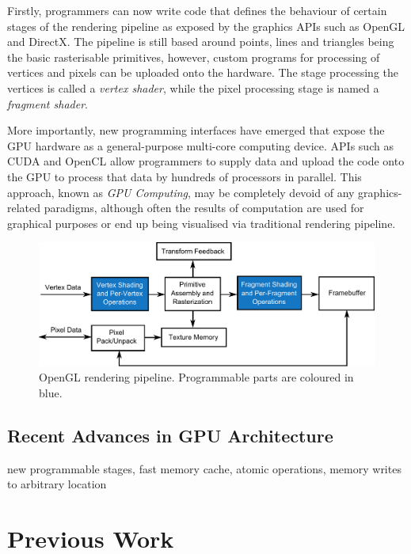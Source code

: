 \documentclass[11pt,a4paper,twoside]{article}
\begin{document}
Firstly, programmers can now write code that defines the behaviour of certain stages of the rendering pipeline as exposed by the graphics APIs such as OpenGL and DirectX. The pipeline is still based around points, lines and triangles being the basic rasterisable primitives, however, custom programs for processing of vertices and pixels can be uploaded onto the hardware. The stage processing the vertices is called a \emph{vertex shader}, while the pixel processing stage is named a \emph{fragment shader}.

More importantly, new programming interfaces have emerged that expose the GPU hardware as a general-purpose multi-core computing device. APIs such as CUDA and OpenCL allow programmers to supply data and upload the code onto the GPU to process that data by hundreds of processors in parallel. This approach, known as \emph{GPU Computing}, may be completely devoid of any graphics-related paradigms, although often the results of computation are used for graphical purposes or end up being visualised via traditional rendering pipeline.

\begin {figure}
	\centering
	\includegraphics [width=1.0\columnwidth]{figures/gl_pipeline}
	\caption {OpenGL rendering pipeline. Programmable parts are coloured in blue.}
	\label {fig:gl_pipeline}
\end {figure}

\subsection{Recent Advances in GPU Architecture}

new programmable stages,
fast memory cache,
atomic operations,
memory writes to arbitrary location

\section {Previous Work}
\end{document}
